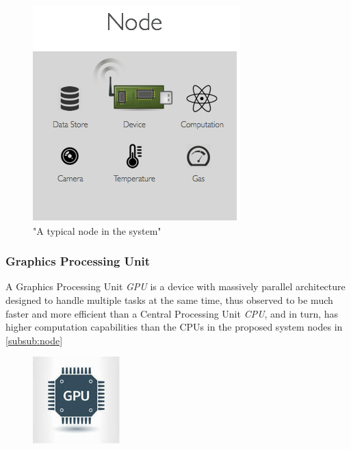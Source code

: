 \begin{figure}[H]
\centering
 \includegraphics[scale=0.4]{images/node.png}
 \caption{"A typical node in the system"}
 \label{fig:node}
\end{figure}

\subsubsection{Graphics Processing Unit }

A Graphics Processing Unit \textit{GPU} is a device with massively parallel architecture designed to handle multiple tasks at the same time, thus observed to be much faster and more efficient than a Central Processing Unit \textit{CPU}, and in turn, has higher computation capabilities than the CPUs in the proposed system nodes in \ref{subsub:node}

\begin{figure}[H]
	\centering
	\includegraphics[scale=0.7]{images/gpu.png}
	\label{fig:gpu}
\end{figure}

